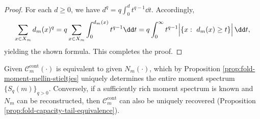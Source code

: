 \begin{proof}
For each \(d\ge 0\), we have \(d^q=q\int_{0}^{d}t^{q-1}\dd t\).
Accordingly,
\[
\sum_{x\in X_m}d_m(x)^q
=q\sum_{x\in X_m}\int_{0}^{d_m(x)} t^{q-1}\dd t
=q\int_{0}^{\infty} t^{q-1}\Bigl|\{x:\ d_m(x)\ge t\}\Bigr|\,\dd t,
\]
yielding the shown formula. This completes the proof.
\end{proof}

\begin{corollary}\label{cor:fold-capacity-moment-completeness}
Given \(\mathcal{C}_m^{\mathrm{cont}}(\cdot)\) is equivalent to given \(N_m(\cdot)\), which by Proposition \ref{prop:fold-moment-mellin-stieltjes} uniquely determines the entire moment spectrum \(\{S_q(m)\}_{q>0}\).
Conversely, if a sufficiently rich moment spectrum is known and \(N_m\) can be reconstructed, then \(\mathcal{C}_m^{\mathrm{cont}}\) can also be uniquely recovered (Proposition \ref{prop:fold-capacity-tail-equivalence}).
\end{corollary}
